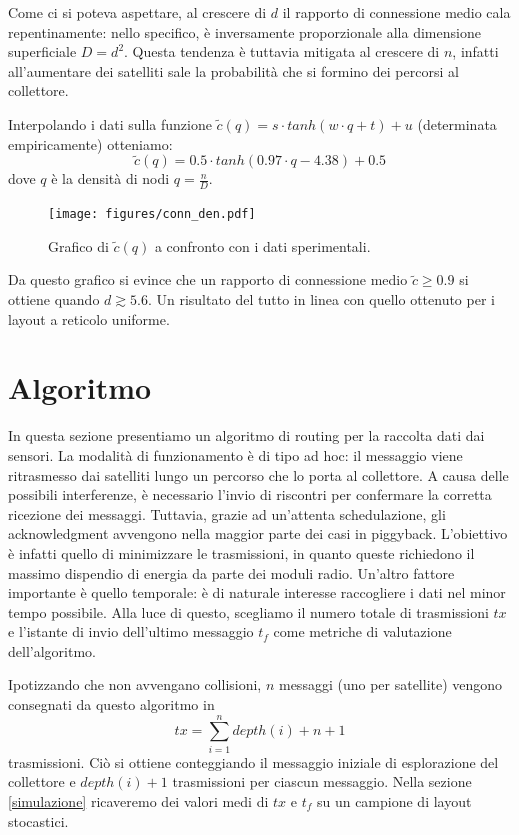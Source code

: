 \documentclass[a4paper,11pt]{article}
\theoremstyle{definition}
\begin{document}
Come ci si poteva aspettare, al crescere di $d$ il rapporto di connessione medio cala repentinamente: nello specifico, è inversamente proporzionale alla dimensione superficiale $D = d^2$. Questa tendenza è tuttavia mitigata al crescere di $n$, infatti all'aumentare dei satelliti sale la probabilità che si formino dei percorsi al collettore.

Interpolando i dati sulla funzione $\tilde{c}(q) = s \cdot tanh(w \cdot q + t) + u$ (determinata empiricamente) otteniamo:
\begin{equation*}
\tilde{c}(q) = 0.5 \cdot tanh(0.97 \cdot q - 4.38) + 0.5
\end{equation*}
dove $q$ è la densità di nodi $q = \frac{n}{D}$.

\begin{figure}[H]
\centering
\texttt{[image: figures/conn\_den.pdf]}
\caption{Grafico di $\tilde{c}(q)$ a confronto con i dati sperimentali.}
\end{figure}

Da questo grafico si evince che un rapporto di connessione medio $\tilde{c} \geq 0.9$ si ottiene quando $d \gtrsim 5.6$. Un risultato del tutto in linea con quello ottenuto per i layout a reticolo uniforme.

\section{Algoritmo}

In questa sezione presentiamo un algoritmo di routing per la raccolta dati dai sensori. La modalità di funzionamento è di tipo ad hoc: il messaggio viene ritrasmesso dai satelliti lungo un percorso che lo porta al collettore. A causa delle possibili interferenze, è necessario l'invio di riscontri per confermare la corretta ricezione dei messaggi. Tuttavia, grazie ad un'attenta schedulazione, gli acknowledgment avvengono nella maggior parte dei casi in piggyback. L'obiettivo è infatti quello di minimizzare le trasmissioni, in quanto queste richiedono il massimo dispendio di energia da parte dei moduli radio. Un'altro fattore importante è quello temporale: è di naturale interesse raccogliere i dati nel minor tempo possibile. Alla luce di questo, scegliamo il numero totale di trasmissioni $tx$ e l'istante di invio dell'ultimo messaggio $t_f$ come metriche di valutazione dell'algoritmo.

Ipotizzando che non avvengano collisioni, $n$ messaggi (uno per satellite) vengono consegnati da questo algoritmo in
\begin{equation*}
tx = \sum_{i=1}^{n} depth(i) + n + 1
\end{equation*}
trasmissioni. Ciò si ottiene conteggiando il messaggio iniziale di esplorazione del collettore e $depth(i) + 1$ trasmissioni per ciascun messaggio. Nella sezione \ref{simulazione} ricaveremo dei valori medi di $tx$ e $t_f$ su un campione di layout stocastici.
\end{document}
